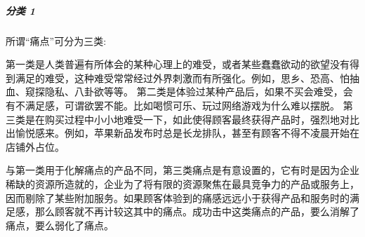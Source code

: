 \documentclass[letterpaper,10pt,english]{sphinxmanual}
\begin{document}
\subparagraph{分类 1\sphinxfootnotemark[257]}
\label{\detokenize{chapter_introduction/opportunity:id5}}%
\begin{footnotetext}[257]\sphinxAtStartFootnote
{}
%
\end{footnotetext}\ignorespaces 
所谓“痛点”可分为三类:

第一类是人类普遍有所体会的某种心理上的难受，或者某些蠢蠢欲动的欲望没有得到满足的难受，这种难受常常经过外界刺激而有所强化。例如，思乡、恐高、怕抽血、窥探隐私、八卦欲等等。
第二类是体验过某种产品后，如果不买会难受，会有不满足感，可谓欲罢不能。比如喝惯可乐、玩过网络游戏为什么难以摆脱。
第三类是在购买过程中小小地难受一下，如此使得顾客最终获得产品时，强烈地对比出愉悦感来。例如，苹果新品发布时总是长龙排队，甚至有顾客不得不凌晨开始在店铺外占位。

与第一类用于化解痛点的产品不同，第三类痛点是有意设置的，它有时是因为企业稀缺的资源所造就的，企业为了将有限的资源聚焦在最具竞争力的产品或服务上，因而剔除了某些附加服务。如果顾客体验到的痛感远远小于获得产品和服务时的满足感，那么顾客就不再计较这其中的痛点。成功击中这类痛点的产品，要么消解了痛点，要么弱化了痛点。
\end{document}
